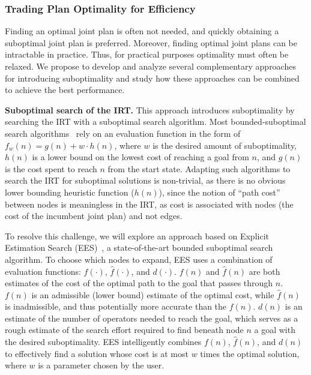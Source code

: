 \documentclass[11pt]{article}
\begin{document}
\subsubsection{Trading Plan Optimality for Efficiency}
\label{sec:tradingPlan1}
Finding an optimal joint plan is often not needed, and quickly obtaining a suboptimal joint plan is preferred. %
Moreover, finding optimal joint plans can be intractable in practice. Thus, for practical purposes optimality must often be relaxed. We propose to develop and analyze several complementary approaches for introducing suboptimality and study how these approaches can be combined to achieve the best performance. 

{\bf Suboptimal search of the IRT.} 
This approach introduces suboptimality by searching the IRT with a suboptimal search algorithm. Most bounded-suboptimal search algorithms~\cite{pohl1973avoidance,pearl1982studies,thayer2011bounded} rely on an evaluation function in the form of $f_w(n)=g(n)+w\cdot h(n)$, where $w$ is the desired amount of suboptimality, $h(n)$ is a lower bound on the lowest cost of reaching a goal from $n$, and $g(n)$ is the cost spent to reach $n$ from the start state. Adapting such algorithms to search the IRT for suboptimal solutions is non-trivial, as there is no obvious lower bounding heuristic function ($h(n)$), since the notion of ``path cost'' between nodes is meaningless in the IRT, as cost is associated with nodes (the cost of the incumbent joint plan) and not edges. 

To resolve this challenge, we will explore an approach based on Explicit Estimation Search (EES)~\cite{thayer2011bounded}, a state-of-the-art bounded suboptimal search algorithm. To choose which nodes to expand, EES uses a combination of evaluation functions: $f(\cdot)$, $\hat{f}(\cdot)$, and $d(\cdot)$. $f(n)$ and $\hat{f}(n)$ are both estimates of the cost of the optimal path to the goal that passes through $n$. $f(n)$ is an admissible (lower bound) estimate of the optimal cost, while $\hat{f}(n)$ is inadmissible, and thus potentially more accurate than the $f(n)$. $d(n)$ is an estimate of the number of operators needed to reach the goal, which serves as a rough estimate of the search effort required to find  beneath node $n$ a goal with the desired suboptimality. EES intelligently combines $f(n)$, $\hat{f}(n)$, and $d(n)$ to effectively find a solution whose cost is at most $w$ times the optimal solution, where $w$ is a parameter chosen by the user.
\end{document}

